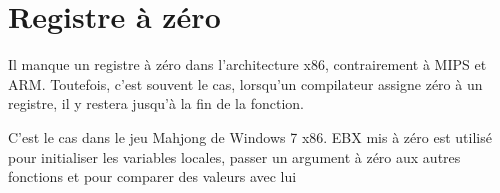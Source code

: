 \section{Registre à zéro}

Il manque un registre à zéro dans l'architecture x86, contrairement à MIPS et ARM.
Toutefois, c'est souvent le cas, lorsqu'un compilateur assigne zéro à un registre,
il y restera jusqu'à la fin de la fonction.

C'est le cas dans le jeu Mahjong de Windows 7 x86.
EBX mis à zéro est utilisé pour initialiser les variables locales, passer un argument
à zéro aux autres fonctions et pour comparer des valeurs avec lui




